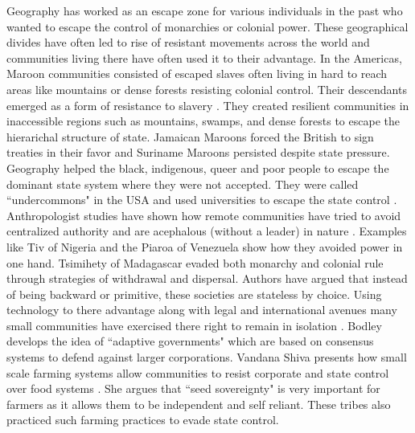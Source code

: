 \begin{sloppypar}
Geography has worked as an escape zone for various individuals in the past who wanted to escape the control of monarchies or colonial power. These geographical divides have often led to rise of resistant movements across the world and communities living there have often used it to their advantage. In the Americas, Maroon communities consisted of escaped slaves often living in hard to reach areas like mountains or dense forests resisting colonial control. Their descendants emerged as a form of resistance to slavery \citep{price2020rainforest}. They created resilient communities in inaccessible regions such as mountains, swamps, and dense forests to escape the hierarichal structure of state. Jamaican Maroons forced the British to sign treaties in their favor and Suriname Maroons persisted despite state pressure. Geography helped the  black, indigenous, queer and poor people to escape the dominant state system where they were not accepted. They were called ``undercommons" in the USA and used  universities to escape the state control \citep{harney2013undercommons}. Anthropologist studies have shown how remote communities have tried to avoid centralized authority and are acephalous (without a leader) in nature \citep{graeber2004fragments}. Examples like Tiv of Nigeria and the Piaroa of Venezuela show how they avoided power in one hand. Tsimihety of Madagascar evaded both monarchy and colonial rule through strategies of withdrawal and dispersal. Authors have argued that instead of being backward or primitive, these societies are stateless by choice. Using technology to there advantage along with legal and international avenues many small communities have exercised there right to remain in isolation \citep{bodley2012anthropology,bodley2014victims}. Bodley develops the idea of ``adaptive governments" which are based on consensus systems to defend against larger corporations. Vandana Shiva presents how small scale farming systems allow communities to resist corporate and state control over food systems \citep{hrynkow2018}. She argues that ``seed sovereignty" is very important for farmers as it allows them to be independent and self reliant. These tribes also practiced such farming practices to evade state control.  


\end{sloppypar}
